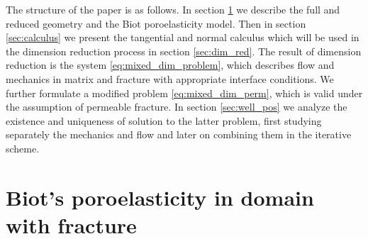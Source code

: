 \documentclass[a4paper]{article}
\numberwithin{equation}{section}
\begin{document}
The structure of the paper is as follows.
In section \ref{sec:model} we describe the full and reduced geometry and the Biot poroelasticity model.
Then in section \ref{sec:calculus} we present the tangential and normal calculus which will be used in the dimension reduction process in section \ref{sec:dim_red}.
The result of dimension reduction is the system \eqref{eq:mixed_dim_problem}, which describes flow and mechanics in matrix and fracture with appropriate interface conditions.
We further formulate a modified problem \eqref{eq:mixed_dim_perm}, which is valid under the assumption of permeable fracture.
In section \ref{sec:well_pos} we analyze the existence and uniqueness of solution to the latter problem, first studying separately the mechanics and flow and later on combining them in the iterative scheme.


\section{Biot's poroelasticity in domain with fracture}\label{sec:model}
\end{document}
